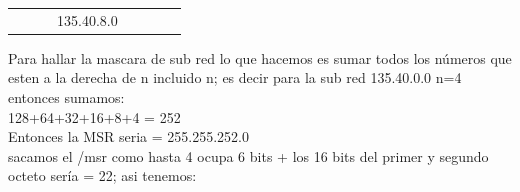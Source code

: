 \begin{table}[htbp]
\begin{tabular}{@{}llllllll@{}}
                                                              &                                                            &                                                         & 135.40.8.0                                                                 &                                                                &                                                               &                                                               &                                                           
\end{tabular}
\end{table}

Para hallar la mascara de sub red lo que hacemos es sumar todos los n\'umeros que esten a la derecha de n incluido n; es decir para la sub red 135.40.0.0 n=4
entonces sumamos: \\
128+64+32+16+8+4 = 252\\
Entonces la MSR seria = 255.255.252.0\\
sacamos el /msr como hasta 4 ocupa 6 bits + los 16 bits del primer y segundo octeto ser\'ia = 22; asi tenemos:

